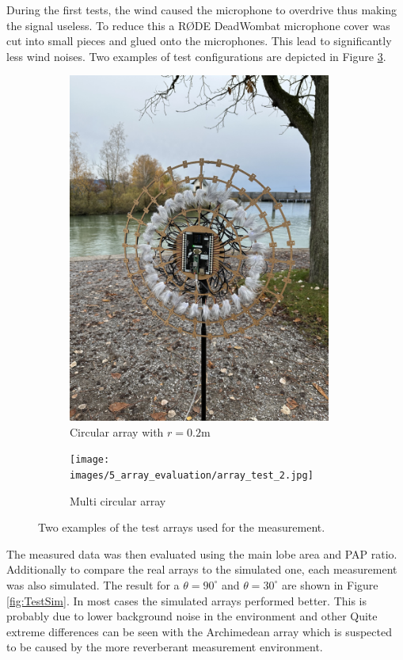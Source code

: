 During the first tests, the wind caused the microphone to overdrive
thus making the signal useless.
To reduce this a RØDE DeadWombat microphone cover was cut into small pieces
and glued onto the microphones.
This lead to significantly less wind noises.
Two examples of test configurations are depicted in Figure \ref*{fig:testSetup}.
\begin{figure}[h]
	\centering
	\begin{subfigure}[b]{0.49\textwidth}
		\centering
		\includegraphics[width=0.95\textwidth]{images/5_array_evaluation/array_test_1.jpg}
		\caption{Circular array with $r=0.2$m}
		\label{fig:array_test_1}
	\end{subfigure}
	\begin{subfigure}[b]{0.49\textwidth}
		\centering
		\texttt{[image: images/5\_array\_evaluation/array\_test\_2.jpg]}
		\caption{Multi circular array}
		\label{fig:array_test_2}
	\end{subfigure}
	\caption{Two examples of the test arrays used for the measurement.}
	\label{fig:testSetup}
\end{figure}
The measured data was then evaluated using the main lobe area and PAP ratio.
Additionally to compare the real arrays to the simulated one, each measurement
was also simulated.
The result for a $\theta = 90^\circ$ and $\theta = 30^\circ$ are shown in
Figure \ref*{fig:TestSim}.
In most cases the simulated arrays performed better.
This is probably due to lower background noise in the environment and other
Quite extreme differences can be seen with the Archimedean array which is
suspected to be caused by the more reverberant measurement environment.

